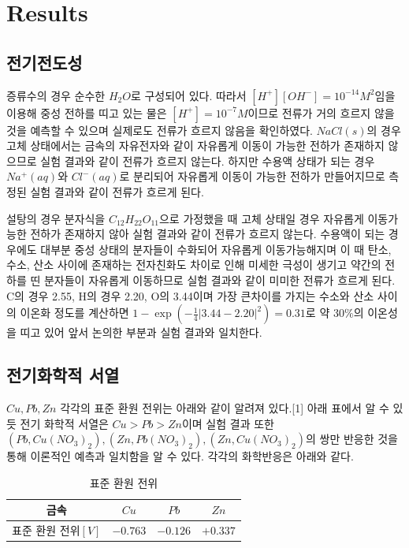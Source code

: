 \documentclass[%
 reprint,
 amsmath,amssymb,
 aps,
]{revtex4-2}
\begin{document}
\section{\label{sec:level1}Results}
\subsection{\label{sec:level2}전기전도성}
증류수의 경우 순수한 $H_{2}O$로 구성되어 있다. 따라서 $[H^{+}][OH^{-}] = 10^{-14} M^{2}$임을 이용해 중성 전하를 띠고 있는 물은 $[H^{+}] = 10^{-7}M$이므로 전류가 거의 흐르지 않을 것을 예측할 수 있으며 실제로도 전류가 흐르지 않음을 확인하였다. $NaCl(s)$의 경우 고체 상태에서는 금속의 자유전자와 같이 자유롭게 이동이 가능한 전하가 존재하지 않으므로 실험 결과와 같이 전류가 흐르지 않는다. 하지만 수용액 상태가 되는 경우 $Na^{+}(aq)$와 $Cl^{-}(aq)$로 분리되어 자유롭게 이동이 가능한 전하가 만들어지므로 측정된 실험 결과와 같이 전류가 흐르게 된다. 

설탕의 경우 분자식을 $C_{12}H_{22}O_{11}$으로 가정했을 때 고체 상태일 경우 자유롭게 이동가능한 전하가 존재하지 않아 실험 결과와 같이 전류가 흐르지 않는다. 수용액이 되는 경우에도 대부분 중성 상태의 분자들이 수화되어 자유롭게 이동가능해지며 이 때 탄소, 수소, 산소 사이에 존재하는 전자친화도 차이로 인해 미세한 극성이 생기고 약간의 전하를 띤 분자들이 자유롭게 이동하므로 실험 결과와 같이 미미한 전류가 흐르게 된다. C의 경우 2.55, H의 경우 2.20, O의 3.44이며 가장 큰차이를 가지는 수소와 산소 사이의 이온화 정도를 계산하면 $1-\exp\left(-\frac{1}{4}|3.44-2.20|^{2}\right) = 0.31$로 약 $30\%$의 이온성을 띠고 있어 앞서 논의한 부분과 실험 결과와 일치한다.

\subsection{\label{sec:level2}전기화학적 서열}
$Cu, Pb, Zn$ 각각의 표준 환원 전위는 아래와 같이 알려져 있다.[1] 아래 표에서 알 수 있듯 전기 화학적 서열은 $Cu > Pb > Zn$이며 실험 결과 또한 $(Pb,Cu(NO_{3})_{2}), (Zn, Pb(NO_{3})_{2}), (Zn,Cu(NO_{3})_{2})$의 쌍만 반응한 것을 통해 이론적인 예측과 일치함을 알 수 있다. 각각의 화학반응은 아래와 같다.
\begin{table}[]
\begin{tabular}{c|c|c|c} \hline \hline
 금속 & $Cu$ & $Pb$ & $Zn$ \\ \hline
표준 환원 전위$[V]$ & $ -0.763$ & $-0.126$ & $+0.337$ \\  \hline \hline 
\end{tabular}
\caption{\label{tab:STDV}표준 환원 전위}
\end{table}
\end{document}
